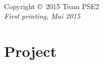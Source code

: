\documentclass[11pt,fleqn,openany]{book} %
\begin{document}

\newpage
~\vfill
\thispagestyle{empty}

\noindent Copyright \copyright\ 2015 Team PSE2\\ %




\noindent \textit{First printing, Mai 2015} %



\pagestyle{empty} %

\tableofcontents %

\cleardoublepage %

\pagestyle{fancy} %


\part{Project}
\end{document}
